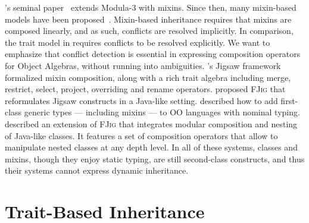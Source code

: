 \citeauthor{bracha1990mixin}'s seminal paper~\citep{bracha1990mixin} extends
Modula-3 with mixins. Since then, many mixin-based models have been
proposed~\citep{flatt1998classes,bono1999core, ancona2003jam}. Mixin-based
inheritance requires that mixins are composed linearly, and as such, conflicts
are resolved implicitly. In comparison, the trait model in \sedel requires
conflicts to be resolved explicitly. We want to emphasize that conflict
detection is essential in expressing composition operators for Object Algebras,
without running into ambiguities. \citeauthor{bracha1992programming}'s Jigsaw
framework~\citep{bracha1992programming} formalized mixin composition, along with
a rich trait algebra including merge, restrict, select, project, overriding and
rename operators. \citet{LAGORIO201286} proposed \textsc{FJig} that reformulates
Jigsaw constructs in a Java-like setting. \citet{DBLP:conf/oopsla/AllenBC03}
described how to add first-class generic types --- including mixins --- to OO
languages with nominal typing. \citet{Corradi_2012} described an extension of
\textsc{FJig} that integrates modular composition and nesting of Java-like
classes. It features a set of composition operators that allow to manipulate
nested classes at any depth level. In all of these systems, classes and mixins,
though they enjoy static typing, are still second-class constructs, and thus
their systems cannot express dynamic inheritance.


\section{Trait-Based Inheritance}

